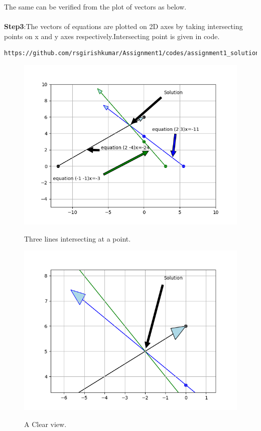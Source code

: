 \documentclass[journal,12pt,twocolumn]{IEEEtran}
\begin{document}
The same can be verified from the plot of vectors as below.\\
\\
\textbf{Step3}:The vectors of equations are plotted on 2D axes by taking intersecting points on x and y axes respectively.Intersecting point is given in code.\\
\begin{lstlisting}
https://github.com/rsgirishkumar/Assignment1/codes/assignment1_solution.py
\end{lstlisting}
\begin{figure}[htbp]
  \centering \includegraphics[width=\columnwidth]{assignment1solution_graph1.png}\label{fig0}
  \caption{Three lines intersecting at a point.}\label{cap2}
  \label{fig:Intersection point (-2,5)}
\end{figure} 
\begin{figure}[htbp]
  \centering \includegraphics[width=\columnwidth]{assignment1solution_graph.png}\label{fig1}
  \caption{A Clear view.}\label{cap1}
  \label{fig:Intersection point (-2,5)}
\end{figure} 
\end{document}
